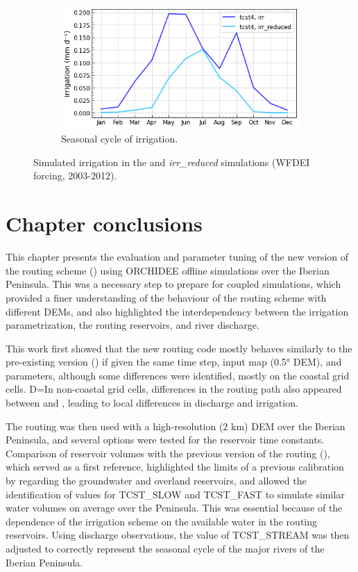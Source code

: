 \begin{figure}[htbp]
    \begin{subfigure}[b]{0.5\textwidth}        
        \caption{Seasonal cycle of irrigation.} 
        \includegraphics[width=\textwidth]{images/chap3/time_series/irrigation_seasonal_cycle_irr_reduced.png}
    \end{subfigure}
    \caption{Simulated irrigation in the \irr and \textit{irr\_reduced} simulations (WFDEI forcing, 2003-2012).}
    \label{fig:merit_irr_reduced}
\end{figure}

\pagebreak

\section{Chapter conclusions}

This chapter presents the evaluation and parameter tuning of the new version of the routing scheme (\native) using ORCHIDEE offline simulations over the Iberian Peninsula. This was a necessary step to prepare for coupled simulations, which provided a finer understanding of the behaviour of the routing scheme with different DEMs, and also highlighted the interdependency between the irrigation parametrization, the routing reservoirs, and river discharge. 

This work first showed that the new routing code mostly behaves similarly to the pre-existing version (\std) if given the same time step, input map (0.5° DEM), and parameters, although some differences were identified, mostly on the coastal grid cells. D=In non-coastal grid cells, differences in the routing path also appeared between \std and \native, leading to local differences in discharge and irrigation.

The \native routing was then used with a high-resolution (2 km) DEM over the Iberian Peninsula, and several options were tested for the reservoir time constants. 
Comparison of reservoir volumes with the previous version of the routing (\std), which served as a first reference, highlighted the limits of a previous calibration by \citet{kilic_evaluation_2023} regarding the groundwater and overland reservoirs, and allowed the identification of values for TCST\_SLOW and TCST\_FAST to simulate similar water volumes on average over the Peninsula. This was essential because of the dependence of the irrigation scheme on the available water in the routing reservoirs.
Using discharge observations, the value of TCST\_STREAM was then adjusted to correctly represent the seasonal cycle of the major rivers of the Iberian Peninsula.

